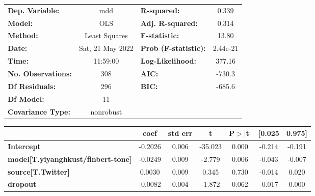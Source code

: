 \begin{center}
\begin{tabular}{lclc}
\toprule
\textbf{Dep. Variable:}                    &       mdd        & \textbf{  R-squared:         } &     0.339   \\
\textbf{Model:}                            &       OLS        & \textbf{  Adj. R-squared:    } &     0.314   \\
\textbf{Method:}                           &  Least Squares   & \textbf{  F-statistic:       } &     13.80   \\
\textbf{Date:}                             & Sat, 21 May 2022 & \textbf{  Prob (F-statistic):} &  2.44e-21   \\
\textbf{Time:}                             &     11:59:00     & \textbf{  Log-Likelihood:    } &    377.16   \\
\textbf{No. Observations:}                 &         308      & \textbf{  AIC:               } &    -730.3   \\
\textbf{Df Residuals:}                     &         296      & \textbf{  BIC:               } &    -685.6   \\
\textbf{Df Model:}                         &          11      & \textbf{                     } &             \\
\textbf{Covariance Type:}                  &    nonrobust     & \textbf{                     } &             \\
\bottomrule
\end{tabular}
\begin{tabular}{lcccccc}
                                           & \textbf{coef} & \textbf{std err} & \textbf{t} & \textbf{P$> |$t$|$} & \textbf{[0.025} & \textbf{0.975]}  \\
\midrule
\textbf{Intercept}                         &      -0.2026  &        0.006     &   -35.023  &         0.000        &       -0.214    &       -0.191     \\
\textbf{model[T.yiyanghkust/finbert-tone]} &      -0.0249  &        0.009     &    -2.779  &         0.006        &       -0.043    &       -0.007     \\
\textbf{source[T.Twitter]}                 &       0.0030  &        0.009     &     0.345  &         0.730        &       -0.014    &        0.020     \\
\textbf{dropout}                           &      -0.0082  &        0.004     &    -1.872  &         0.062        &       -0.017    &        0.000     \\

\end{tabular}
\end{center}
